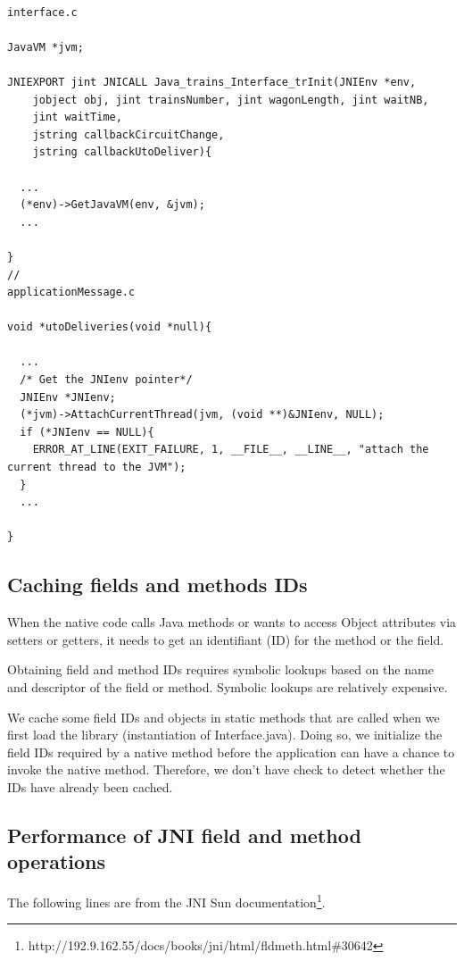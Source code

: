 \documentclass[a4paper,10pt]{report}
\begin{document}
\lstset{language=C}
\lstset{commentstyle=\textit} 
\begin{lstlisting}

interface.c

JavaVM *jvm;

JNIEXPORT jint JNICALL Java_trains_Interface_trInit(JNIEnv *env, 
    jobject obj, jint trainsNumber, jint wagonLength, jint waitNB, 
    jint waitTime, 
    jstring callbackCircuitChange,
    jstring callbackUtoDeliver){

  ...  
  (*env)->GetJavaVM(env, &jvm);
  ...

}
//
applicationMessage.c

void *utoDeliveries(void *null){

  ...
  /* Get the JNIenv pointer*/
  JNIEnv *JNIenv;
  (*jvm)->AttachCurrentThread(jvm, (void **)&JNIenv, NULL);
  if (*JNIenv == NULL){
    ERROR_AT_LINE(EXIT_FAILURE, 1, __FILE__, __LINE__, "attach the current thread to the JVM");
  }
  ...

}
\end{lstlisting}

\subsection{Caching fields and methods IDs}

When the native code calls Java methods or wants to access Object attributes via setters or getters, it needs to get an identifiant (ID)
for the method or the field.

Obtaining field and method IDs requires symbolic lookups based
    on the name and descriptor of the field or method. Symbolic lookups
    are relatively expensive.
    
    We cache some field IDs and objects in static methods that are called
    when we first load the library (instantiation of Interface.java).
    Doing so, we initialize the field IDs required by a native method before
    the application can have a chance to invoke the native method.
    Therefore, we don't have check to detect whether the IDs have already
    been cached.

\subsection{Performance of JNI field and method operations}

The following lines are from the JNI Sun documentation\footnote{http://192.9.162.55/docs/books/jni/html/fldmeth.html\#30642}.\\
\end{document}

